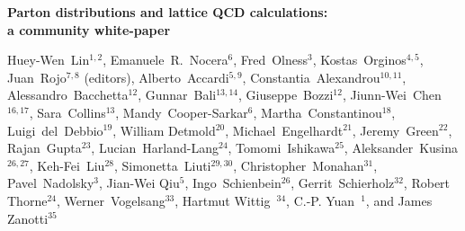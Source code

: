 \documentclass[twoside,12pt]{article}
\numberwithin{equation}{section}
\numberwithin{figure}{section}
\numberwithin{table}{section}
\begin{document}
\linenumbers

\vspace{.3cm}

\begin{center}
{\Large \bf Parton distributions and lattice QCD calculations:\\[0.2cm] a community white-paper}
\vspace{.4cm}

{\small 
  Huey-Wen~Lin$^{1,2}$,
  Emanuele~R.~Nocera$^6$,
  Fred~Olness$^3$,
  Kostas~Orginos$^{4,5}$,
  Juan~Rojo$^{7,8}$ (editors),
Alberto~Accardi$^{5,9}$, 
Constantia~Alexandrou$^{10,11}$, 
Alessandro~Bacchetta$^{12}$, 
Gunnar~Bali$^{13,14}$, 
Giuseppe~Bozzi$^{12}$, 
Jiunn-Wei~Chen$^{16,17}$, 	
Sara~Collins$^{13}$, 	
Mandy~Cooper-Sarkar$^{6}$, 
Martha~Constantinou$^{18}$, 
Luigi~del~Debbio$^{19}$, 
William Detmold$^{20}$, 
Michael~Engelhardt$^{21}$, 
Jeremy~Green$^{22}$, 
Rajan~Gupta$^{23}$, 
Lucian~Harland-Lang$^{24}$, 
Tomomi~Ishikawa$^{25}$, 
Aleksander~Kusina$^{26,27}$, 
Keh-Fei~Liu$^{28}$, 	
Simonetta~Liuti$^{29,30}$, 		
Christopher~Monahan$^{31}$, 		
Pavel~Nadolsky$^{3}$,
Jian-Wei Qiu$^{5}$,
Ingo~Schienbein$^{26}$, 	
Gerrit~Schierholz$^{32}$,
Robert Thorne$^{24}$,
Werner~Vogelsang$^{33}$,
Hartmut Wittig~$^{34}$, 
C.-P. Yuan~$^{1}$, and
James Zanotti$^{35}$
}


\end{center}
\end{document}
